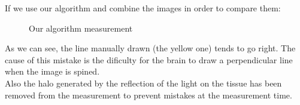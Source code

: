 If we use our algorithm and combine the images in order to compare them:

    \begin{figure}[H]
      \caption{Our algorithm measurement}
      \centering \setlength\fboxsep{0pt} \setlength\fboxrule{0.5pt}
    \end{figure}

As we can see, the line manually drawn (the yellow one)
tends to go right. The cause of this mistake is the dificulty for the brain
to draw a perpendicular line when the image is spined. \\
Also the halo generated by the reflection of the light on the tissue
has been removed from the measurement to prevent mistakes at the 
measurement time.
